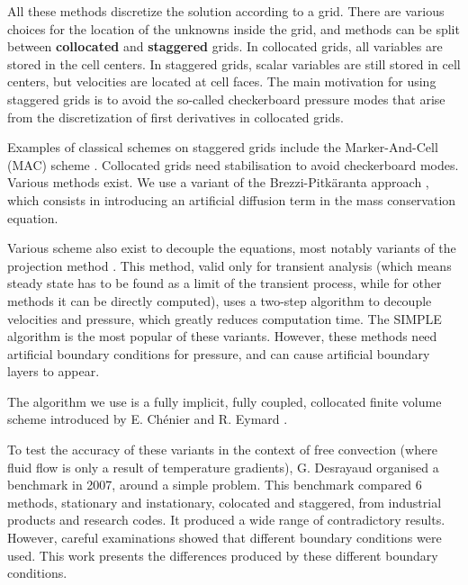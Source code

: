 \documentclass[12pt]{article}
\begin{document}
All these methods discretize the solution according to a grid. There
are various choices for the location of the unknowns inside the grid,
and methods can be split between {\bf collocated} and {\bf staggered}
grids. In collocated grids, all variables are stored in the cell
centers. In staggered grids, scalar variables are still stored in cell
centers, but velocities are located at cell faces. The main motivation
for using staggered grids is to avoid the so-called checkerboard
pressure modes that arise from the discretization of first derivatives
in collocated grids.

Examples of classical schemes on staggered grids include the
Marker-And-Cell (MAC) scheme
\cite{har-65-num,Pat-80-num,har-65-num,nic-92-ana,cho-97-ana,cho-97-mac}. Collocated
grids need stabilisation to avoid checkerboard modes. Various methods
exist. We use a variant of the Brezzi-Pitk{\"a}ranta approach
\cite{mat-97-apr,brezzip,brezzip2}, which consists in introducing an
artificial diffusion term in the mass conservation equation.

Various scheme also exist to decouple the equations, most notably
variants of the projection method \cite{mat-97-pre}. This method,
valid only for transient analysis (which means steady state has to be
found as a limit of the transient process, while for other methods it
can be directly computed), uses a two-step algorithm to decouple
velocities and pressure, which greatly reduces computation time. The
SIMPLE algorithm is the most popular of these variants. However, these
methods need artificial boundary conditions for pressure, and can
cause artificial boundary layers to appear.

The algorithm we use is a fully implicit, fully coupled, collocated
finite volume scheme introduced by E. Chénier and R. Eymard
\cite{che-09-col,che-08-col,che-06-num}.

To test the accuracy of these variants in the context of free
convection (where fluid flow is only a result of temperature
gradients), G. Desrayaud organised a benchmark in 2007, around a
simple problem. This benchmark compared 6 methods, stationary and
instationary, colocated and staggered, from industrial products and
research codes. It produced a wide range of contradictory
results. However, careful examinations showed that different boundary
conditions were used. This work presents the differences produced by
these different boundary conditions.

\end{document}

